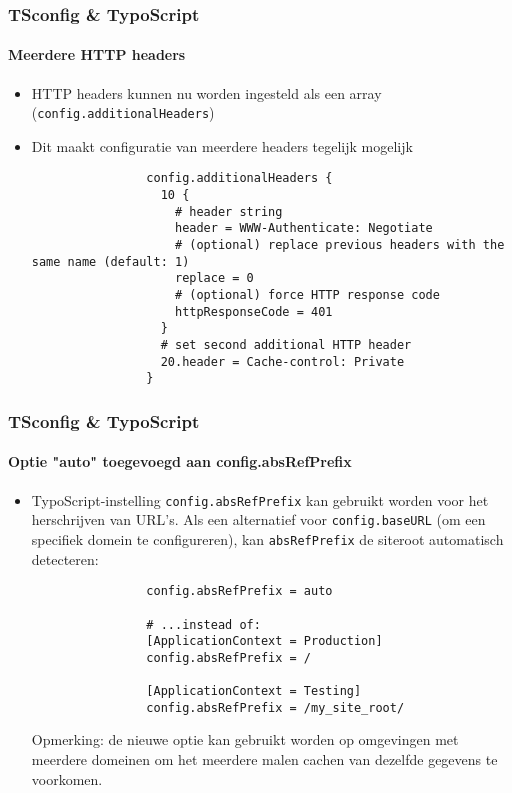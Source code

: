 \begin{frame}[fragile]
	\frametitle{TSconfig \& TypoScript}
	\framesubtitle{Meerdere HTTP headers}

	\begin{itemize}

		\item HTTP headers kunnen nu worden ingesteld als een array (\small\texttt{config.additionalHeaders}\normalsize)
		\item Dit maakt configuratie van meerdere headers tegelijk mogelijk

			\begin{lstlisting}
				config.additionalHeaders {
				  10 {
				    # header string
				    header = WWW-Authenticate: Negotiate
				    # (optional) replace previous headers with the same name (default: 1)
				    replace = 0
				    # (optional) force HTTP response code
				    httpResponseCode = 401
				  }
				  # set second additional HTTP header
				  20.header = Cache-control: Private
				}
			\end{lstlisting}

	\end{itemize}

\end{frame}


\begin{frame}[fragile]
	\frametitle{TSconfig \& TypoScript}
	\framesubtitle{Optie "auto" toegevoegd aan config.absRefPrefix}

	\begin{itemize}
		\item TypoScript-instelling \texttt{config.absRefPrefix} kan gebruikt worden voor het 
			herschrijven van URL's. Als een alternatief voor \texttt{config.baseURL} 
			(om een  specifiek domein te configureren), kan \texttt{absRefPrefix} 
			de siteroot automatisch detecteren:

			\begin{lstlisting}
				config.absRefPrefix = auto

				# ...instead of:
				[ApplicationContext = Production]
				config.absRefPrefix = /

				[ApplicationContext = Testing]
				config.absRefPrefix = /my_site_root/
			\end{lstlisting}

		\smaller
			Opmerking: de nieuwe optie kan gebruikt worden op omgevingen met meerdere domeinen
			om het meerdere malen cachen van dezelfde gegevens te voorkomen.
		\normalsize

	\end{itemize}

\end{frame}

